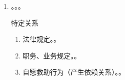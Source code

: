 \begin{enumerate}
\begin{enumerate}
\begin{enumerate}
                  \item {}。。。
                        \begin{kk}{特定关系}
                          \begin{enumerate}
                            \item 法律规定。。
                            \item 职务、业务规定。。
                            \item 自愿救助行为（产生依赖关系）。。
                          \end{enumerate}
                        \end{kk}


\end{enumerate}
\end{enumerate}
\end{enumerate}
